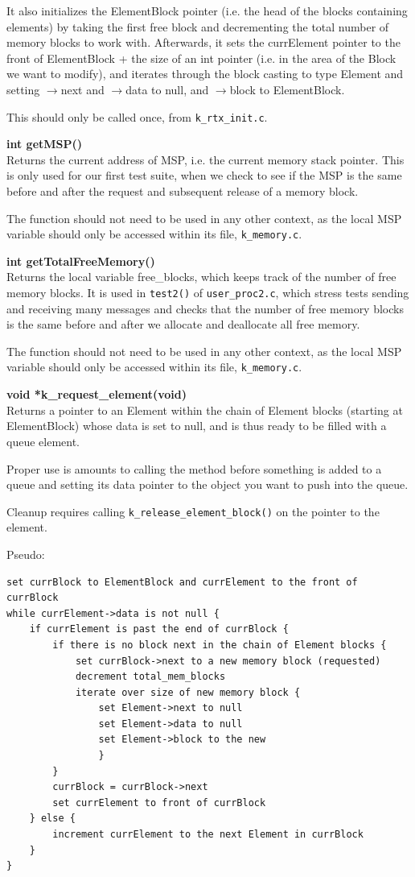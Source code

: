 \documentclass[11pt, oneside]{article}
\begin{document}
It also initializes the ElementBlock pointer (i.e. the head of the blocks containing elements) by taking the first free block and decrementing the total number of memory blocks to work with. Afterwards, it sets the currElement pointer to the front of ElementBlock + the size of an int pointer (i.e. in the area of the Block we want to modify), and iterates through the block casting to type Element and setting $\rightarrow$next and $\rightarrow$data to null, and $\rightarrow$block to ElementBlock.

This should only be called once, from {\tt k\_rtx\_init.c}.


{\bf int getMSP()}\\
Returns the current address of MSP, i.e. the current memory stack pointer. This is only used for our first test suite, when we check to see if the MSP is the same before and after the request and subsequent release of a memory block.

The function should not need to be used in any other context, as the local MSP variable should only be accessed within its file, {\tt k\_memory.c}.

{\bf int getTotalFreeMemory()}\\
Returns the local variable free\_blocks, which keeps track of the number of free memory blocks. It is used in {\tt test2()} of {\tt user\_proc2.c}, which stress tests sending and receiving many messages and checks that the number of free memory blocks is the same before and after we allocate and deallocate all free memory.

The function should not need to be used in any other context, as the local MSP variable should only be accessed within its file, {\tt k\_memory.c}.

{\bf void *k\_request\_element(void)}\\
Returns a pointer to an Element within the chain of Element blocks (starting at ElementBlock) whose data is set to null, and is thus ready to be filled with a queue element.

Proper use is amounts to calling the method before something is added to a queue and setting its data pointer to the object you want to push into the queue. 

Cleanup requires calling {\tt k\_release\_element\_block()} on the pointer to the element.

Pseudo:
\begin{verbatim}
set currBlock to ElementBlock and currElement to the front of currBlock
while currElement->data is not null {
    if currElement is past the end of currBlock {
        if there is no block next in the chain of Element blocks {
            set currBlock->next to a new memory block (requested)
            decrement total_mem_blocks
            iterate over size of new memory block {
                set Element->next to null
                set Element->data to null
                set Element->block to the new 
                }
        }
        currBlock = currBlock->next
        set currElement to front of currBlock
    } else {
        increment currElement to the next Element in currBlock
    }
}
\end{verbatim}
\end{document}
